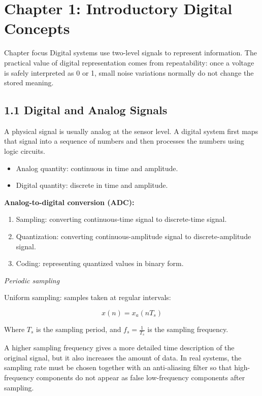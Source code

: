 \documentclass[11pt,a4paper]{article}
\providecommand{\tightlist}{\setlength{\itemsep}{1pt}\setlength{\parskip}{0pt}}
\begin{document}
\section{Chapter 1: Introductory Digital
Concepts}\label{chapter-1-introductory-digital-concepts}

\begin{chapterbox}{Chapter focus}
Digital systems use two-level signals to represent information. The practical value of digital representation comes from repeatability: once a voltage is safely interpreted as 0 or 1, small noise variations normally do not change the stored meaning.
\end{chapterbox}

\subsection{1.1 Digital and Analog
Signals}\label{digital-and-analog-signals}

A physical signal is usually analog at the sensor level. A digital
system first maps that signal into a sequence of numbers and then
processes the numbers using logic circuits.

\begin{itemize}
\tightlist
\item
  Analog quantity: continuous in time and amplitude.
\item
  Digital quantity: discrete in time and amplitude.
\end{itemize}

\textbf{Analog-to-digital conversion (ADC):}

\begin{enumerate}
\def\labelenumi{\arabic{enumi}.}
\tightlist
\item
  Sampling: converting continuous-time signal to discrete-time signal.
\item
  Quantization: converting continuous-amplitude signal to
  discrete-amplitude signal.
\item
  Coding: representing quantized values in binary form.
\end{enumerate}

\emph{Periodic sampling}

Uniform sampling: samples taken at regular intervals:

\[x(n) = x_a(nT_s)\]

Where \(T_s\) is the sampling period, and \(f_s = \frac{1}{T_s}\) is the
sampling frequency.

A higher sampling frequency gives a more detailed time description of
the original signal, but it also increases the amount of data. In real
systems, the sampling rate must be chosen together with an anti-aliasing
filter so that high-frequency components do not appear as false
low-frequency components after sampling.
\end{document}
